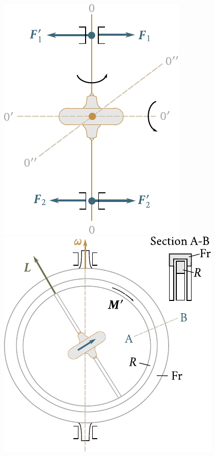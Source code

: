 \begin{figure}[!htb]
	\begin{minipage}[t]{0.45\linewidth}
		\begin{center}
			\includegraphics[scale=0.95]{figures/ch_05/fig_5_25.pdf}
			\caption[]{}
			\label{fig:5_25}
		\end{center}
	\end{minipage}
	\hspace{-0.05cm}
	\begin{minipage}[t]{0.55\linewidth}
		\begin{center}
			\includegraphics[scale=0.95]{figures/ch_05/fig_5_26.pdf}
			\caption[]{}
			\label{fig:5_26}
		\end{center}
	\end{minipage}
\end{figure}

